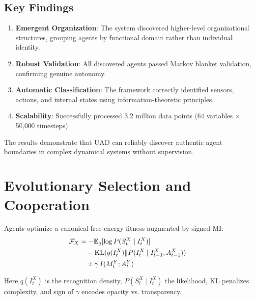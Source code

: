 \documentclass[10pt,conference]{IEEEtran}
\begin{document}
\subsection{Key Findings}
\begin{enumerate}
  \item \textbf{Emergent Organization}: The system discovered higher-level organizational structures, grouping agents by functional domain rather than individual identity.
  \item \textbf{Robust Validation}: All discovered agents passed Markov blanket validation, confirming genuine autonomy.
  \item \textbf{Automatic Classification}: The framework correctly identified sensors, actions, and internal states using information-theoretic principles.
  \item \textbf{Scalability}: Successfully processed 3.2 million data points (64 variables × 50,000 timesteps).
\end{enumerate}

The results demonstrate that UAD can reliably discover authentic agent boundaries in complex dynamical systems without supervision.

\section{Evolutionary Selection and Cooperation}
Agents optimize a canonical free‐energy fitness augmented by signed MI:
\begin{align}
\mathcal F_X &= -\mathbb{E}_q[\log P(S^X_t\mid I^X_t)] \notag \\
&\quad - \mathrm{KL}(q(I^X_t)\|P(I^X_t\mid I^X_{t-1},A^X_{t-1})) \notag \\
&\quad \pm\gamma\,I(M^Y_t;A^Y_t)
\end{align}

Here $q(I^X_t)$ is the recognition density, $P(S^X_t\mid I^X_t)$ the likelihood, KL penalizes complexity, and sign of $\gamma$ encodes opacity vs. transparency.
\end{document}
